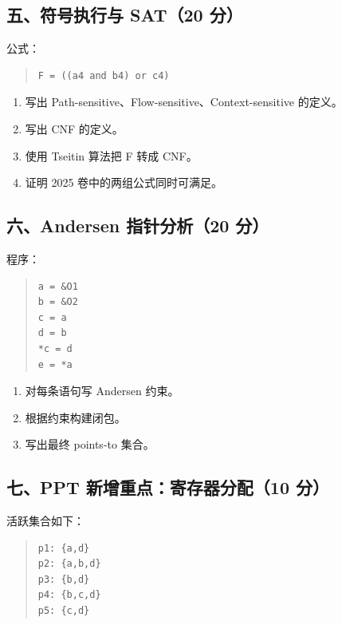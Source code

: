 \documentclass[UTF8,zihao=-4]{ctexart}
\begin{document}
\subsection{五、符号执行与 SAT（20 分）}


公式：


\begin{quote}
\footnotesize
\begin{verbatim}
F = ((a4 and b4) or c4)
\end{verbatim}
\end{quote}


\begin{enumerate}
\item 写出 Path-sensitive、Flow-sensitive、Context-sensitive 的定义。
\item 写出 CNF 的定义。
\item 使用 Tseitin 算法把 F 转成 CNF。
\item 证明 2025 卷中的两组公式同时可满足。
\end{enumerate}


\subsection{六、Andersen 指针分析（20 分）}


程序：


\begin{quote}
\footnotesize
\begin{verbatim}
a = &O1
b = &O2
c = a
d = b
*c = d
e = *a
\end{verbatim}
\end{quote}


\begin{enumerate}
\item 对每条语句写 Andersen 约束。
\item 根据约束构建闭包。
\item 写出最终 points-to 集合。
\end{enumerate}


\subsection{七、PPT 新增重点：寄存器分配（10 分）}


活跃集合如下：

\begin{quote}
\footnotesize
\begin{verbatim}
p1: {a,d}
p2: {a,b,d}
p3: {b,d}
p4: {b,c,d}
p5: {c,d}
\end{verbatim}
\end{quote}
\end{document}
